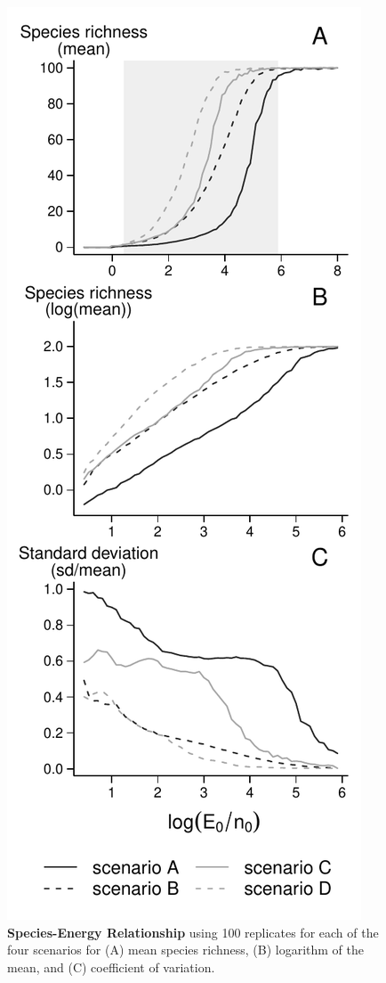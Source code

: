 \begin{figure}[htbp]
\centering
\includegraphics{fig/fig1.pdf}
\caption{\textbf{Species-Energy Relationship} using 100 replicates for
each of the four scenarios for (A) mean species richness, (B) logarithm
of the mean, and (C) coefficient of variation.\label{fig:etib1}}
\end{figure}

